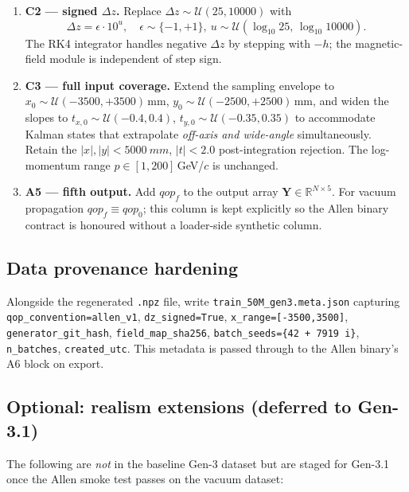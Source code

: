 \documentclass[a4paper,11pt]{article}
\newcommand{\SI}[2]{#1~#2}
\newcommand{\mm}{mm}
\newcommand{\dz}{\Delta z}
\begin{document}
\begin{enumerate}
        evaluated.
  \item \textbf{C2 --- signed $\dz$.}  Replace
        $\dz \sim \mathcal{U}(25,10000)$ with
        \begin{equation}
          \dz = \epsilon \cdot 10^{u},
          \quad \epsilon\sim\{-1,+1\},\ u\sim\mathcal{U}(\log_{10}25,\,\log_{10}10000).
        \end{equation}
        The RK4 integrator handles negative $\dz$ by stepping with
        $-h$; the magnetic-field module is independent of step sign.
  \item \textbf{C3 --- full input coverage.}  Extend the sampling
        envelope to
        $x_0\sim\mathcal{U}(-3500,+3500)$\,mm,
        $y_0\sim\mathcal{U}(-2500,+2500)$\,mm, and widen the slopes
        to $t_{x,0}\sim\mathcal{U}(-0.4,0.4)$,
        $t_{y,0}\sim\mathcal{U}(-0.35,0.35)$ to accommodate Kalman
        states that extrapolate \emph{off-axis and wide-angle}
        simultaneously.  Retain the $|x|,|y|<\SI{5000}{\mm}$,
        $|t|<2.0$ post-integration rejection.  The log-momentum
        range $p\in[1,200]$\,GeV/$c$ is unchanged.
  \item \textbf{A5 --- fifth output.}  Add $qop_f$ to the output
        array $\mathbf{Y}\in\mathbb{R}^{N\times 5}$.  For vacuum
        propagation $qop_f\equiv qop_0$; this column is kept
        explicitly so the Allen binary contract is honoured without
        a loader-side synthetic column.
\end{enumerate}

\subsection{Data provenance hardening}

Alongside the regenerated \texttt{.npz} file, write
\texttt{train\_50M\_gen3.meta.json} capturing
\texttt{qop\_convention=allen\_v1},
\texttt{dz\_signed=True},
\texttt{x\_range=[-3500,3500]},
\texttt{generator\_git\_hash},
\texttt{field\_map\_sha256},
\texttt{batch\_seeds=\{42 + 7919 i\}},
\texttt{n\_batches},
\texttt{created\_utc}.  This metadata is passed through to the Allen
binary's A6 block on export.

\subsection{Optional: realism extensions (deferred to Gen-3.1)}

The following are \emph{not} in the baseline Gen-3 dataset but are
staged for Gen-3.1 once the Allen smoke test passes on the vacuum
dataset:
\end{document}
